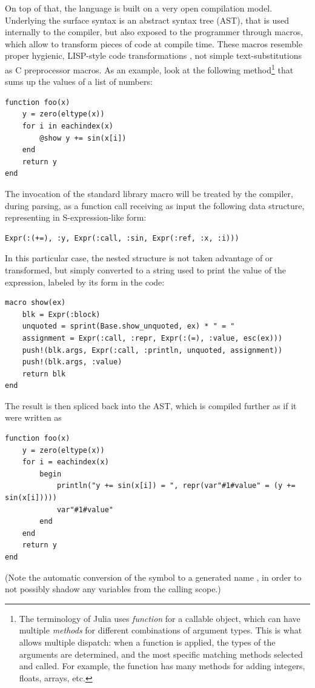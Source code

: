 On top of that, the language is built on a very open compilation model.  Underlying the surface
syntax is an abstract syntax tree (AST), that is used internally to the compiler, but also exposed
to the programmer through macros, which allow to transform pieces of code at compile time.  These
macros resemble proper hygienic, LISP-style code transformations \parencite[cf.][]{hoyte2008let},
not simple text-substitutions as C preprocessor macros.  As an example, look at the following
method\footnote{The terminology of Julia uses \emph{function} for a callable object, which can have
  multiple \emph{methods} for different combinations of argument types.  This is what allows
  multiple dispatch: when a function is applied, the types of the arguments are determined, and the
  most specific matching methods selected and called.  For example, the \protect\jlinl{+} function
  has many methods for adding integers, floats, arrays, etc.}  that sums up the  values of a
list of numbers:
\begin{lstlisting}
function foo(x)
    y = zero(eltype(x))
    for i in eachindex(x)
        @show y += sin(x[i])
    end
    return y
end
\end{lstlisting}
The invocation of the standard library macro  will be treated by the compiler, during
parsing, as a function call receiving as input the following data structure, representing  in S-expression-like form:
\begin{lstlisting}
Expr(:(+=), :y, Expr(:call, :sin, Expr(:ref, :x, :i)))
\end{lstlisting}
In this particular case, the nested structure is not taken advantage of or transformed, but simply
converted to a string used to print the value of the expression, labeled by its form in the code:
\begin{lstlisting}
macro show(ex)
    blk = Expr(:block)
    unquoted = sprint(Base.show_unquoted, ex) * " = "
    assignment = Expr(:call, :repr, Expr(:(=), :value, esc(ex)))
    push!(blk.args, Expr(:call, :println, unquoted, assignment))
    push!(blk.args, :value)
    return blk
end
\end{lstlisting}
The result is then spliced back into the AST, which is compiled further as if it were written as
\begin{lstlisting}
function foo(x)
    y = zero(eltype(x))
    for i = eachindex(x)
        begin
            println("y += sin(x[i]) = ", repr(var"#1#value" = (y += sin(x[i]))))
            var"#1#value"
        end
    end
    return y
end
\end{lstlisting}
(Note the automatic conversion of the symbol  to a generated name , in
order to not possibly shadow any variables from the calling scope.)


